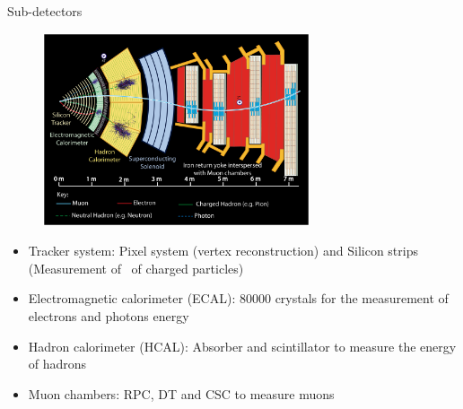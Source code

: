 \begin{frame}{Sub-detectors}
\vspace{-.2cm}
\begin{figure}[!Hhtbp]
  \begin{center}
    \includegraphics[width=0.7\textwidth]{../figs/PictureforPoint5_oct04_allp.jpg}
  \end{center}
\end{figure}
\vspace{-.4cm}
\begin{block}{}
\begin{itemize}\tiny
\item Tracker system: Pixel system (vertex reconstruction) and Silicon strips (Measurement of \pt~of charged particles)
\item Electromagnetic calorimeter (ECAL): 80000 crystals for the measurement of electrons and photons energy
\item Hadron calorimeter (HCAL): Absorber and scintillator to measure the energy of hadrons
\item Muon chambers: RPC, DT and CSC to measure muons \pt
\end{itemize}
\end{block}

\end{frame}


